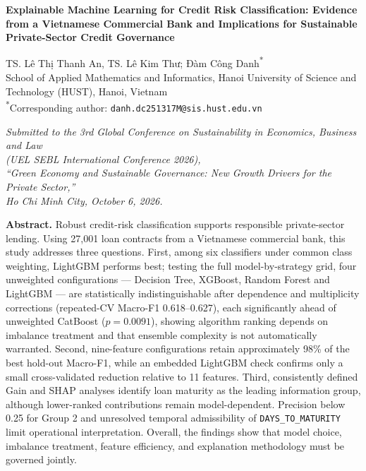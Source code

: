 \documentclass[11pt,a4paper]{article}
\begin{document}
\renewcommand{\figurename}{Figure}
\renewcommand{\tablename}{Table}
\pagestyle{plain}

\begin{center}
{\LARGE\bfseries Explainable Machine Learning for Credit Risk Classification: Evidence from a Vietnamese Commercial Bank and Implications for Sustainable Private-Sector Credit Governance}

\vspace{1em}
{\large TS. Lê Thị Thanh An, TS. Lê Kim Thư; Đàm Công Danh\textsuperscript{*}}\\[0.2em]
School of Applied Mathematics and Informatics, Hanoi University of Science and Technology (HUST), Hanoi, Vietnam\\[0.1em]
\textsuperscript{*}Corresponding author: \texttt{danh.dc251317M@sis.hust.edu.vn}

\vspace{0.8em}
\textit{Submitted to the 3rd Global Conference on Sustainability in Economics, Business and Law\\
(UEL SEBL International Conference 2026),\\
``Green Economy and Sustainable Governance: New Growth Drivers for the Private Sector,''\\
Ho Chi Minh City, October 6, 2026.}
\end{center}

\vspace{1em}
\noindent\textbf{Abstract.}\quad
Robust credit-risk classification supports responsible private-sector lending. Using 27{,}001 loan contracts from a Vietnamese commercial bank, this study addresses three questions. First, among six classifiers under common class weighting, LightGBM performs best; testing the full model-by-strategy grid, four unweighted configurations --- Decision Tree, XGBoost, Random Forest and LightGBM --- are statistically indistinguishable after dependence and multiplicity corrections (repeated-CV Macro-F1 0.618--0.627), each significantly ahead of unweighted CatBoost ($p=0.0091$), showing algorithm ranking depends on imbalance treatment and that ensemble complexity is not automatically warranted. Second, nine-feature configurations retain approximately 98\% of the best hold-out Macro-F1, while an embedded LightGBM check confirms only a small cross-validated reduction relative to 11 features. Third, consistently defined Gain and SHAP analyses identify loan maturity as the leading information group, although lower-ranked contributions remain model-dependent. Precision below 0.25 for Group 2 and unresolved temporal admissibility of \texttt{DAYS\_TO\_MATURITY} limit operational interpretation. Overall, the findings show that model choice, imbalance treatment, feature efficiency, and explanation methodology must be governed jointly.
\end{document}
